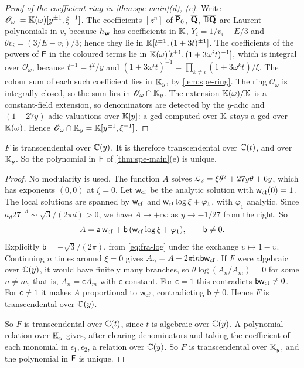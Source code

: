 \begin{proof}[Proof of the coefficient ring in \cref{thm:spe-main}\textup{(d), (e)}]
Write $\mathscr{O}_{\omega}\coloneqq\mathbb{K}(\omega)[y^{\pm1},\xi^{-1}]$. The coefficients $[z^n]$ of $\overline{\mathsf{P}}_0$, $\overline{\mathbf{Q}}$, $\overline{\mathbb{D}}\overline{\mathbf{Q}}$ are Laurent polynomials in $v$, because $h_{\mathbf{w}}$ has coefficients in $\mathbb{K}$, $Y_i=1/v_i-E/3$ and $\theta v_i=(3/E-v_i)/3$; hence they lie in $\mathbb{K}[t^{\pm1},(1+3t)^{\pm1}]$. The coefficients of the powers of $\mathsf{F}$ in the coloured terms lie in $\mathbb{K}(\omega)[t^{\pm1},(1+3\omega^it)^{-1}]$, which is integral over $\mathscr{O}_{\omega}$, because $t^{-1}=t^2/y$ and $(1+3\omega^it)^{-1}=\prod_{k\neq i}(1+3\omega^kt)/\xi$. The colour sum of each such coefficient lies in $\mathbb{K}_{y}$, by \cref{lem:spe-ring}. The ring $\mathscr{O}_{\omega}$ is integrally closed, so the sum lies in $\mathscr{O}_{\omega}\cap\mathbb{K}_{y}$. The extension $\mathbb{K}(\omega)/\mathbb{K}$ is a constant-field extension, so denominators are detected by the $y$-adic and $(1+27y)$-adic valuations over $\mathbb{K}[y]$: a gcd computed over $\mathbb{K}$ stays a gcd over $\mathbb{K}(\omega)$. Hence $\mathscr{O}_{\omega}\cap\mathbb{K}_{y}=\mathbb{K}[y^{\pm1},\xi^{-1}]$.
\end{proof}

\begin{prop}
\label{prop:spe-transc}
$F$ is transcendental over $\mathbb{C}(y)$. It is therefore transcendental over $\mathbb{C}(t)$, and over $\mathbb{K}_{y}$. So the polynomial in $\mathsf{F}$ of \cref{thm:spe-main}\textup{(e)} is unique.
\end{prop}

\begin{proof}
No modularity is used. The function $A$ solves $\mathcal{L}_{2}=\xi\theta^2+27y\theta+6y$, which has exponents $(0,0)$ at $\xi=0$. Let $\mathsf{w}_{\mathrm{cf}}$ be the analytic solution with $\mathsf{w}_{\mathrm{cf}}(0)=1$. The local solutions are spanned by $\mathsf{w}_{\mathrm{cf}}$ and $\mathsf{w}_{\mathrm{cf}}\log\xi+\varphi_1$, with $\varphi_1$ analytic. Since $a_d27^{-d}\sim\sqrt3/(2\pi d)>0$, we have $A\to+\infty$ as $y\to-1/27$ from the right. So
\[
A=\mathsf{a}\,\mathsf{w}_{\mathrm{cf}}+\mathsf{b}\,(\mathsf{w}_{\mathrm{cf}}\log\xi+\varphi_1),\qquad\mathsf{b}\neq0.
\]
Explicitly $\mathsf{b}=-\sqrt3/(2\pi)$, from \eqref{eq:fra-log} under the exchange $\upsilon\mapsto1-\upsilon$. Continuing $n$ times around $\xi=0$ gives $A_n=A+2\pi\mathrm{i} n\mathsf{b}\mathsf{w}_{\mathrm{cf}}$. If $F$ were algebraic over $\mathbb{C}(y)$, it would have finitely many branches, so $\theta\log(A_n/A_m)=0$ for some $n\neq m$, that is, $A_n=\mathsf{c}A_m$ with $\mathsf{c}$ constant. For $\mathsf{c}=1$ this contradicts $\mathsf{b}\mathsf{w}_{\mathrm{cf}}\neq0$. For $\mathsf{c}\neq1$ it makes $A$ proportional to $\mathsf{w}_{\mathrm{cf}}$, contradicting $\mathsf{b}\neq0$. Hence $F$ is transcendental over $\mathbb{C}(y)$.

So $F$ is transcendental over $\mathbb{C}(t)$, since $t$ is algebraic over $\mathbb{C}(y)$. A polynomial relation over $\mathbb{K}_{y}$ gives, after clearing denominators and taking the coefficient of each monomial in $\epsilon_1,\epsilon_2$, a relation over $\mathbb{C}(y)$. So $F$ is transcendental over $\mathbb{K}_{y}$, and the polynomial in $\mathsf{F}$ is unique.
\end{proof}

